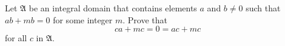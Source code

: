 Let $\mathfrak{A}$ be an integral domain that contains elements $a$ and $b \neq 0$ such that $ab + mb = 0$ for some integer $m$. Prove that
$$ca + mc = 0 = ac + mc$$
for all $c$ in $\mathfrak{A}$.
